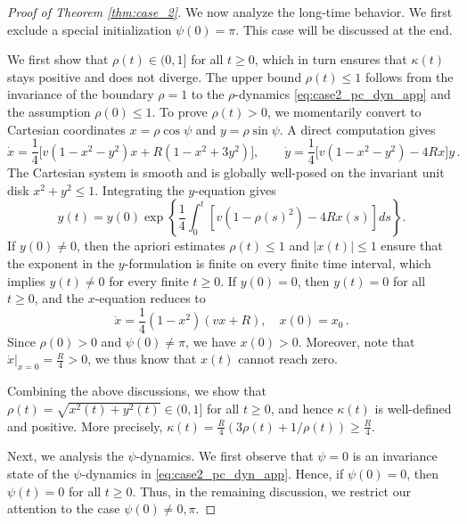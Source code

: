 \documentclass[10pt]{article}
\theoremstyle{definition}
\theoremstyle{definition}
\numberwithin{equation}{section}
\begin{document}
\begin{proof}[Proof of Theorem \ref{thm:case_2}]
We now analyze the long-time behavior.
We first exclude a special initialization $\psi(0) = \pi$. 
This case will be discussed at the end.

We first show that $\rho(t) \in (0,1]$ for all $t \geq 0$, which in turn ensures that $\kappa(t)$ stays positive and does not diverge.
The upper bound $\rho(t) \leq 1$ follows from the invariance of the boundary $\rho = 1$ to the $\rho$-dynamics \eqref{eq:case2_pc_dyn_app} and the assumption $\rho(0) \leq 1$.
To prove $\rho(t) > 0$, we momentarily convert to Cartesian coordinates $x = \rho \cos \psi$ and $y = \rho \sin \psi$.
A direct computation gives
\[
\dot{x} = \frac{1}{4}\Big[v(1 - x^2 - y^2)x + R(1 - x^2 + 3y^2)\Big], \qquad \dot{y} = \frac{1}{4}\Big[v(1 - x^2 - y^2) - 4Rx\Big] y \, .
\]
The Cartesian system is smooth and is globally well-posed on the invariant unit disk $x^2 + y^2 \leq 1$.
Integrating the $y$-equation gives
\begin{equation*}
    y(t) = y(0) \exp \left\{ \frac {1} 4 \int_0^t \left[ v(1 - \rho(s)^2) - 4Rx(s) \right] ds \right\}.
\end{equation*}
If $y(0) \neq 0$, then the apriori estimates $\rho(t) \leq 1$ and $|x(t)| \leq 1$ ensure that the exponent in the $y$-formulation is finite on every finite time interval, which implies $y(t) \neq 0$ for every finite $t \geq 0$.
If $y(0) = 0$, then $y(t) = 0$ for all $t\geq 0$, and the $x$-equation reduces to
\begin{equation*}
    \dot{x} = \frac{1}{4} (1 - x^2) (vx + R), \quad x(0) = x_0 \, .
\end{equation*}
Since $\rho(0) > 0$ and $\psi(0) \neq \pi$, we have $x(0) > 0$.
Moreover, note that $\dot{x}|_{x=0} = \frac{R}{4} > 0$, we thus know that $x(t)$ cannot reach zero.

Combining the above discussions, we show that $\rho(t) = \sqrt{x^2(t) + y^2(t)} \in (0,1]$ for all $t \geq 0$, and hence $\kappa(t)$ is well-defined and positive. 
More precisely, $\kappa(t) = \frac{R}{4} (3\rho(t) + 1/\rho(t)) \geq \frac{R}{4}$.

Next, we analysis the $\psi$-dynamics. 
We first observe that $\psi = 0$ is an invariance state of the $\psi$-dynamics in \eqref{eq:case2_pc_dyn_app}.
Hence, if $\psi(0) = 0$, then $\psi(t) = 0$ for all $t \geq 0$.
Thus, in the remaining discussion, we restrict our attention to the case $\psi(0) \neq 0, \pi$.


\end{proof}
\end{document}
